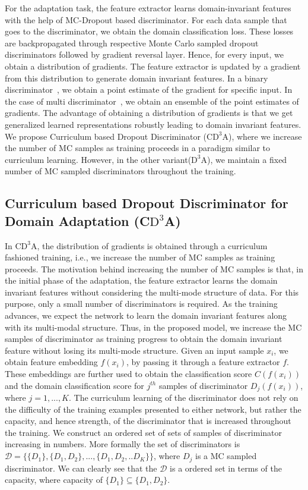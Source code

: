 \documentclass{bmvc2k}
\begin{document}
For the adaptation task, the feature extractor learns domain-invariant features with the help of MC-Dropout based discriminator. For each data sample that goes to the discriminator, we obtain the domain classification loss. These losses are backpropagated through respective Monte Carlo sampled dropout discriminators followed by gradient reversal layer. Hence, for every input, we obtain a distribution of gradients. The feature extractor is updated by a gradient from this distribution to generate domain invariant features. In a binary discriminator~\cite{ganin_ICML2015}, we obtain a point estimate of the gradient for specific input. In the case of multi discriminator~\cite{pei_arxiv2018}, we obtain an ensemble of the point estimates of gradients. The advantage of obtaining a distribution of gradients is that we get generalized learned representations robustly leading to domain invariant features. We propose Curriculum based Dropout Discriminator (C$\text{D}^{3}$A), where we increase the number of MC samples as training proceeds in a paradigm similar to curriculum learning. However, in the other variant($\text{D}^{3}$A), we maintain a fixed number of MC sampled discriminators throughout the training.
\vspace{-1.45em}
\subsection{Curriculum based Dropout Discriminator for Domain Adaptation (C$\text{D}^{3}$A)}
 In C$\text{D}^{3}$A, the distribution of gradients is obtained through a curriculum fashioned training, i.e., we increase the number of MC samples as training proceeds. The motivation behind increasing the number of MC samples is that, in the initial phase of the adaptation, the feature extractor learns the domain invariant features without considering the multi-mode structure of data. For this purpose, only a small number of discriminators is required. As the training advances, we expect the network to learn the domain invariant features along with its multi-modal structure. Thus, in the proposed model, we increase the MC samples of discriminator as training progress to obtain the domain invariant feature without losing its multi-mode structure. 
Given an input sample $x_i$, we obtain feature embedding $f(x_i)$, by passing it through a feature extractor $f$. These embeddings are further used to obtain the classification score $C(f(x_i))$ and the domain classification score for $j^{th}$ samples of discriminator $D_j(f(x_i))$, where $j=1,..., K$.
The curriculum learning of the discriminator does not rely on the difficulty of the training examples presented to either network, but rather the capacity, and hence strength, of the discriminator that is increased throughout the training. We construct an ordered set of sets of samples of discriminator increasing in numbers. More formally the set of discriminators is
$\mathcal{D}=\{ \{ D_1\},\{ D_1,D_2\}, ...,\{ D_1,D_2, .. D_K\} \} $, where $D_j$ is a MC sampled discriminator. We can clearly see that the $\mathcal{D}$ is a ordered set in terms of the capacity, where capacity of $\{ D_1\} \subseteq \{ D_1,D_2\}$.
\vspace{-1em}
\end{document}
